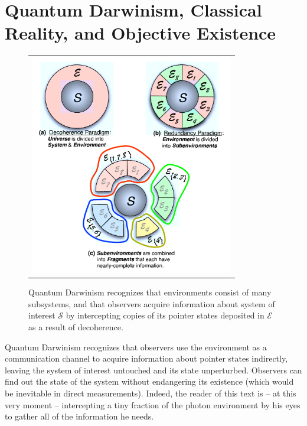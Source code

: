 \documentclass[aps,amsmath,amssymb,amsfonts,12pt]{revtex4-1}
\newcommand{\cS}        {{\mathcal S}}
\newcommand{\cE}        {{\mathcal E}}
\newcommand{\+}         {\dagger}
\newcommand\hocom[1]{}%
\begin{document}
{\section{Quantum Darwinism, Classical Reality, and Objective Existence}

\hocom{Monitoring of the system by the environment (the process responsible for
decoherence) will typically leave behind multiple copies of its pointer states in $\cE$. Pointer states are favored -- only states that can survive decoherence can produce information theoretic progeny in this manner \cite{42,43}. Therefore, only information about
pointer states can be recorded redundantly. States that can survive decoherence
can use the same interactions that are responsible for einselection to proliferate information about
themselves throughout the environment.}

{\begin{figure}[tb]
\begin{tabular}{l}
\vspace{-0.15in} 
\includegraphics[width=3.5in]{EnvSubdivision.pdf}\\
\end{tabular}
\caption{Quantum Darwinism recognizes that environments consist of many subsystems, and that observers acquire information about system of interest $\cS$ by intercepting copies of its pointer states deposited in $\cE$ as a result of decoherence.
}
\label{EnvSubdivision}
\end{figure}

Quantum Darwinism \cite{75,Z00} recognizes that observers use the environment as
a communication channel to acquire information about pointer states indirectly, leaving the system of interest untouched
and its state unperturbed. Observers can
find out the state of the system without endangering its existence (which would be inevitable in direct measurements). Indeed, the reader of this text is -- at this very moment -- intercepting
a tiny fraction of the photon environment by his eyes to gather all of the information he needs. 

}}
\end{document}
